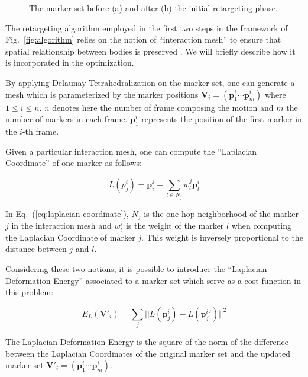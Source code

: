 \documentclass[letterpaper, 10 pt, conference]{ieeeconf}  %
\begin{document}
\begin{figure}[htbp!]
  \vspace*{3cm}
  \caption{The marker set before (a) and after (b) the initial
    retargeting phase.}
  \label{fig:retargeting}
\end{figure}

The retargeting algorithm employed in the first two steps in the
framework of Fig.~\ref{fig:algorithm} relies on 
the notion of ``interaction mesh'' to ensure that 
spatial relationship between bodies is preserved
\cite{Nakaoka12Humanoids}. 
We will briefly describe how it is incorporated in the optimization.

By applying Delaunay Tetrahedralization \cite{Si2005} on the marker
set, one can generate a mesh which is parameterized by the marker
positions $\mathbf{V}_i = (\mathbf{p}^i_1 \cdots \mathbf{p}^i_m)$
where $1 \leq i \leq n$. $n$ denotes here the number of frame
composing the motion and $m$ the number of markers in each
frame. $\mathbf{p}^i_1$ represents the position of the first marker in
the $i$-th frame.

Given a particular interaction mesh, one can compute the ``Laplacian
Coordinate'' of one marker as follows:

\begin{equation}\label{eq:laplacian-coordinate}
L(p^i_j) = \mathbf{p}_i^j - \sum_{l \in N_j} w^j_l \mathbf{p}^i_l
\end{equation}

In Eq.~(\ref{eq:laplacian-coordinate}), $N_j$ is the one-hop
neighborhood of the marker $j$ in the interaction mesh and $w^j_l$ is the
weight of the marker $l$ when computing the Laplacian Coordinate of
marker $j$. This weight is inversely proportional to the distance
between $j$ and $l$.

Considering these two notions, it is possible to introduce the
``Laplacian Deformation Energy'' associated to a marker set which
serve as a cost function in this problem:

\begin{equation}
E_L(\mathbf{V'}_i) = \sum_j || L(\mathbf{p}^i_j) - L(\mathbf{p}^i_j{}') ||^2
\end{equation}

The Laplacian Deformation Energy is the square of the norm of the
difference between the Laplacian Coordinates of the original marker
set and the updated marker set $\mathbf{V}'_i = (\mathbf{p}^i_1 \cdots
\mathbf{p}^i_m)$.
\end{document}
